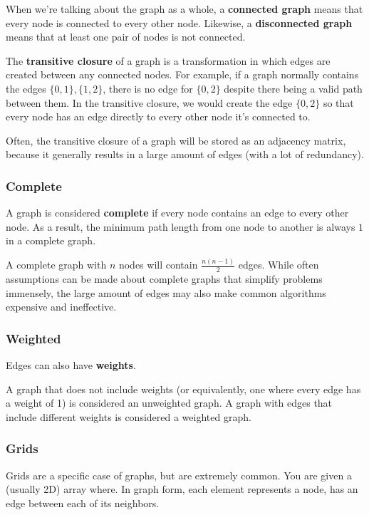 When we're talking about the graph as a whole, a \textbf{connected graph} means that every node is connected to every other node. Likewise, a \textbf{disconnected graph} means that at least one pair of nodes is not connected.

The \textbf{transitive closure} of a graph is a transformation in which edges are created between any connected nodes. For example, if a graph normally contains the edges $\{0,1\},\{1,2\}$, there is no edge for $\{0,2\}$ despite there being a valid path between them. In the transitive closure, we would create the edge $\{0,2\}$ so that every node has an edge directly to every other node it's connected to.

Often, the transitive closure of a graph will be stored as an adjacency matrix, because it generally results in a large amount of edges (with a lot of redundancy).

\subsubsection{Complete}

A graph is considered \textbf{complete} if every node contains an edge to every other node. As a result, the minimum path length from one node to another is always $1$ in a complete graph.

A complete graph with $n$ nodes will contain $\frac{n(n-1)}{2}$ edges. While often assumptions can be made about complete graphs that simplify problems immensely, the large amount of edges may also make common algorithms expensive and ineffective.

\subsubsection{Weighted}

Edges can also have \textbf{weights}.

A graph that does not include weights (or equivalently, one where every edge has a weight of 1) is considered an unweighted graph. A graph with edges that include different weights is considered a weighted graph.

\subsubsection{Grids}

Grids are a specific case of graphs, but are extremely common. You are given a (usually 2D) array where. In graph form, each element represents a node, has an edge between each of its neighbors. 

